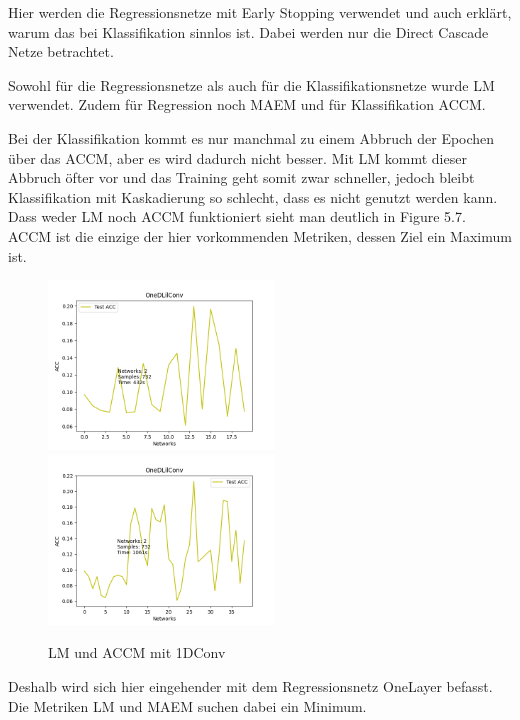 Hier werden die Regressionsnetze mit Early Stopping verwendet und auch erklärt, warum das bei Klassifikation sinnlos ist. 
Dabei werden nur die Direct Cascade Netze betrachtet. 

Sowohl für die Regressionsnetze als auch für die Klassifikationsnetze wurde LM verwendet. 
Zudem für Regression noch MAEM und für Klassifikation ACCM. 

Bei der Klassifikation kommt es nur manchmal zu einem Abbruch der Epochen über das ACCM, aber es wird dadurch nicht besser. Mit LM kommt 
dieser Abbruch öfter vor und das Training geht somit 
zwar schneller, jedoch bleibt Klassifikation mit Kaskadierung so schlecht, dass es nicht genutzt werden kann. Dass weder LM noch ACCM 
funktioniert sieht man deutlich in Figure 5.7. ACCM ist die einzige der hier vorkommenden Metriken, dessen Ziel ein Maximum ist. 

\begin{figure}[htpb]
    \includegraphics[height=4.5cm]{../../Plots/ba_plots/earlystopping/lossmetric/1dconv_ts.png}
    \includegraphics[height=4.5cm]{../../Plots/ba_plots/earlystopping/intermetric/1dconv_ts.png}
    \caption{\label{fig:1dconvmetrics} LM und ACCM mit 1DConv}
\end{figure}

Deshalb wird sich hier eingehender mit dem Regressionsnetz OneLayer befasst. Die Metriken LM und MAEM suchen dabei ein Minimum. 

